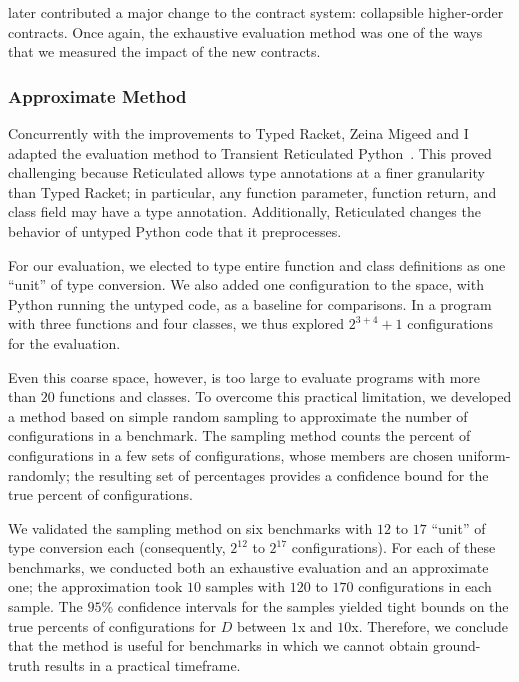  later contributed a major change to the contract system:
 collapsible higher-order contracts.
Once again, the exhaustive evaluation method was one of the ways that we
 measured the impact of the new contracts.


\subsubsection{Approximate Method}

Concurrently with the improvements to Typed Racket, Zeina Migeed and I
 adapted the evaluation method to Transient Reticulated Python~\cite{gm-pepm-2018}.
This proved challenging because Reticulated allows type annotations
 at a finer granularity than Typed Racket; in particular, any function
 parameter, function return, and class field may have a type annotation.
Additionally, Reticulated changes the behavior of untyped Python code that
 it preprocesses.

For our evaluation, we elected to type entire function and class definitions
 as one ``unit'' of type conversion.
We also added one configuration to the space, with Python running the untyped
 code, as a baseline for comparisons.
In a program with three functions and four classes, we thus explored
 $2^{3+4} + 1$ configurations for the evaluation.

Even this coarse space, however, is too large to evaluate programs with more
 than $20$ functions and classes.
To overcome this practical limitation, we developed a method based on
 simple random sampling to approximate the number of 
 configurations in a benchmark.
The sampling method counts the percent of  configurations
 in a few sets of configurations, whose members are chosen uniform-randomly;
 the resulting set of percentages provides a confidence bound for the true
 percent of  configurations.

We validated the sampling method on six benchmarks with $12$ to $17$ ``unit''
 of type conversion each (consequently, $2^{12}$ to $2^{17}$ configurations).
For each of these benchmarks, we conducted both an exhaustive evaluation and
 an approximate one; the approximation took $10$ samples with $120$ to $170$
 configurations in each sample.
The $95$\% confidence intervals for the samples yielded tight bounds on the
 true percents of  configurations for $D$ between $1$x and
 $10$x.
Therefore, we conclude that the method is useful for benchmarks in which we
 cannot obtain ground-truth results in a practical timeframe.


